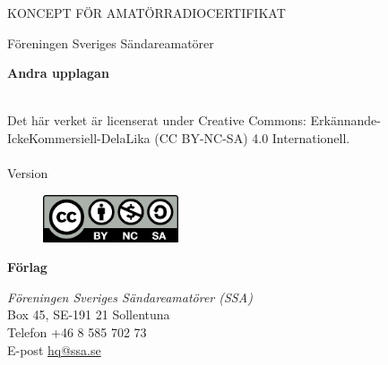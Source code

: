 \vspace{10em}

\begin{center}
\Large{KONCEPT FÖR AMATÖRRADIOCERTIFIKAT}

Föreningen Sveriges Sändareamatörer\\[2\baselineskip]
\end{center}


\noindent \textbf{Andra upplagan}

\noindent
\\
\noindent Det här verket är licenserat under Creative Commons:\newline
\noindent Erkännande-IckeKommersiell-DelaLika (CC BY-NC-SA) 4.0 Internationell.
\\
\\
\noindent Version \revision

\begin{figure}
    \includegraphics[width=4cm]{images/cc-by-nc-sa}
\end{figure}


\vfill

\noindent
\textbf{Förlag}

\noindent
\textit{Föreningen Sveriges Sändareamatörer (SSA)}\\
Box 45, SE-191 21 Sollentuna\\
Telefon +46 8 585 702 73\\
E-post \href{mailto:hq@ssa.se}{hq@ssa.se}\\[\baselineskip]
